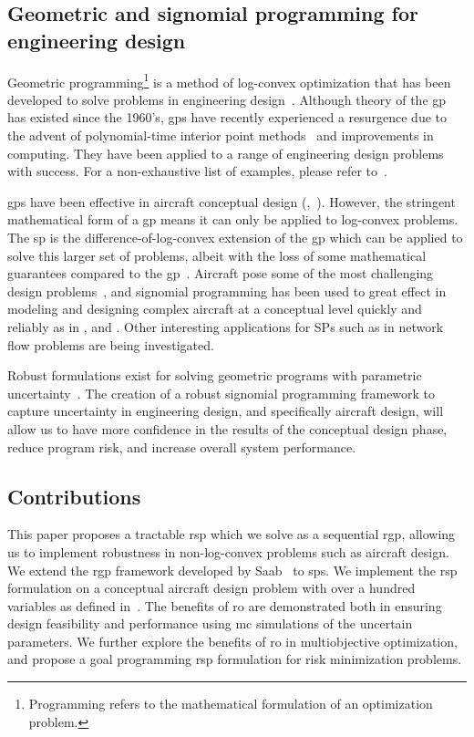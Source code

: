 \subsection{Geometric and signomial programming for engineering design}

Geometric programming\footnote{Programming refers to the mathematical formulation of an optimization problem.}
is a method of log-convex optimization that has been developed
to solve problems in engineering design~\cite{Duffin1967}. Although theory of the \gls{gp} has existed since
the 1960's, \gls{gp}s have recently experienced a resurgence due to the advent of polynomial-time
interior point methods~\cite{Nesterov1994} and improvements in computing. They have been
applied to a range of engineering design problems with success. For a non-exhaustive list of examples,
please refer to~\cite{Boyd2007}.

\gls{gp}s have been effective in aircraft conceptual design
(\cite{Hoburg2013},~\cite{Burton2018}).
However, the stringent mathematical form of a \gls{gp} means it can only be applied to log-convex problems.
The \gls{sp} is the difference-of-log-convex extension of the \gls{gp} which can be applied to
solve this larger set of problems, albeit with the loss of some mathematical guarantees compared to the \gls{gp}~\cite{Kirschen2018}.
Aircraft pose some of the most challenging design problems~\cite{York2018}, and signomial programming
has been used to great effect in modeling and designing complex aircraft at a conceptual level quickly
and reliably as in \cite{York2018}, \cite{Kirschen2018} and \cite{Kirschen2016}.
Other interesting applications for SPs such as in network flow problems are being investigated.

Robust formulations exist for solving geometric programs with parametric uncertainty~\cite{Saab2018}.
The creation of a robust signomial programming framework to capture uncertainty in engineering
design, and specifically aircraft design, will allow us to have more confidence in the results
of the conceptual design phase, reduce program risk, and increase overall system performance.

\subsection{Contributions}

This paper proposes a tractable \gls{rsp} which we solve as a sequential \gls{rgp},
allowing us to implement robustness in non-log-convex problems such as aircraft design.
We extend the \gls{rgp} framework developed by Saab~\cite{Saab2018} to \gls{sp}s.
We implement the \gls{rsp} formulation on a conceptual aircraft design problem with over a hundred
variables as defined in~\cite{Ozturk2018}.
The benefits of \gls{ro} are demonstrated both in ensuring design feasibility and performance
using \gls{mc} simulations of the uncertain parameters.
We further explore the benefits of \gls{ro} in multiobjective optimization, and propose
a goal programming \gls{rsp} formulation for risk minimization problems.


